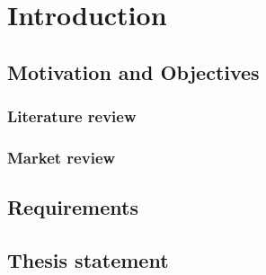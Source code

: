 
\chapter{Introduction}
\section{Motivation and Objectives}
\subsection{Literature review}
\subsection{Market review} 
\section{Requirements}
\section{Thesis statement} 
